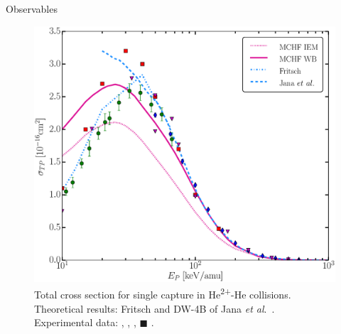 \documentclass[letterpaper, 12 pt]{report}
\begin{document}
\begin{chapter}{Observables \label{chap:p-he2p-he}}
\begin{figure}[htp]
   \centering
   \includegraphics[width = \linewidth]{./images/he2phe/he2phe-TP.eps}
   \caption[Total cross section for single capture in He\textsuperscript{2+}-He
            collisions.]{Total cross section for single capture in He\textsuperscript{2+}-He
            collisions. Theoretical results: Fritsch \cite{Fritsch-94} and DW-4B of Jana
            \textit{et al}.\ \cite{JMP-15}.
            Experimental data: {\color{blue}{$\blacklozenge$}} \cite{SG85},
            {\color{OliveGreen}{$\bullet$}} \cite{SG89}, {\color{RedViolet}{$\blacktriangledown$}}
            \cite{Dubois87}, {\color{red}$\blacksquare$} \cite{Rudd85}. \label{fig:he2phe-tp}}
\end{figure}


\end{chapter}
\end{document}
